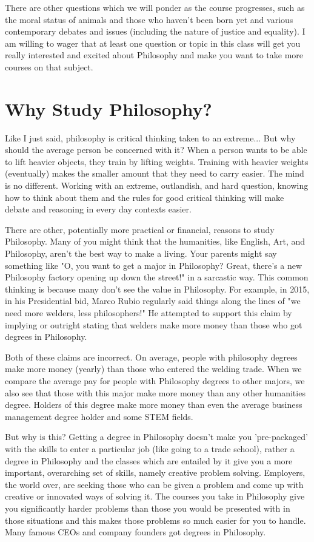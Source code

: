 There are other questions which we will ponder as the course progresses, such as the moral status of animals and those who haven't been born yet and various contemporary debates and issues (including the nature of justice and equality). I am willing to wager that at least one question or topic in this class will get you really interested and excited about Philosophy and make you want to take more courses on that subject. 
\section{Why Study Philosophy?}

Like I just said, philosophy is critical thinking taken to an extreme... But why should the average person be concerned with it? When a person wants to be able to lift heavier objects, they train by lifting weights. Training with heavier weights (eventually) makes the smaller amount that they need to carry easier. The mind is no different. Working with an extreme, outlandish, and hard question, knowing how to think about them and the rules for good critical thinking will make debate and reasoning in every day contexts easier.

There are other, potentially more practical or financial, reasons to study Philosophy. Many of you might think that the humanities, like English, Art, and Philosophy, aren't the best way to make a living. Your parents might say something like "O, you want to get a major in Philosophy? Great, there's a new Philosophy factory opening up down the street!" in a sarcastic way. This common thinking is because many don't see the value in Philosophy. For example, in 2015, in his Presidential bid, Marco Rubio regularly said things along the lines of "we need more welders, less philosophers!"\autocite{philervwelder2} He attempted to support this claim by implying or outright stating that welders make more money than those who got degrees in Philosophy.

Both of these claims are incorrect. On average, people with philosophy degrees make more money (yearly) than those who entered the welding trade.\autocite{weldersvphilers} When we compare the average pay for people with Philosophy degrees to other majors, we also see that those with this major make more money than any other humanities degree.\autocite{philermoney} Holders of this degree make more money than even the average business management degree holder and some STEM fields. 

But why is this? Getting a degree in Philosophy doesn't make you 'pre-packaged' with the skills to enter a particular job (like going to a trade school), rather a degree in Philosophy and the classes which are entailed by it give you a more important, overarching set of skills, namely creative problem solving. Employers, the world over, are seeking those who can be given a problem and come up with creative or innovated ways of solving it. The courses you take in Philosophy give you significantly harder problems than those you would be presented with in those situations and this makes those problems so much easier for you to handle. Many famous CEOs and company founders got degrees in Philosophy. 
